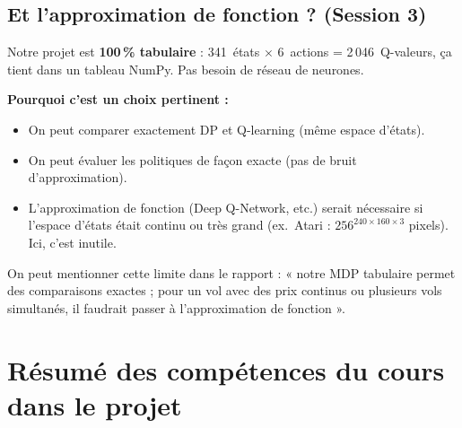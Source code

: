 \documentclass[11pt,a4paper]{article}
\begin{document}
\subsection{Et l'approximation de fonction ? (Session 3)}

Notre projet est \textbf{100\,\% tabulaire} : 341~états $\times$ 6~actions = 2\,046~Q-valeurs, ça tient dans un tableau NumPy. Pas besoin de réseau de neurones.

\textbf{Pourquoi c'est un choix pertinent :}
\begin{itemize}[nosep]
  \item On peut comparer exactement DP et Q-learning (même espace d'états).
  \item On peut évaluer les politiques de façon exacte (pas de bruit d'approximation).
  \item L'approximation de fonction (Deep Q-Network, etc.) serait nécessaire si l'espace d'états était continu ou très grand (ex.~Atari : $256^{240 \times 160 \times 3}$ pixels). Ici, c'est inutile.
\end{itemize}

On peut mentionner cette limite dans le rapport : « notre MDP tabulaire permet des comparaisons exactes ; pour un vol avec des prix continus ou plusieurs vols simultanés, il faudrait passer à l'approximation de fonction ».

\section{Résumé des compétences du cours dans le projet}
\label{sec:competences}
\end{document}
